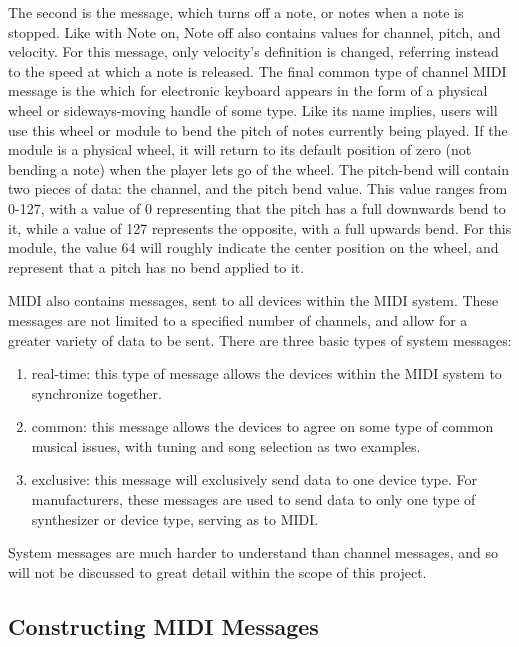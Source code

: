 The second is the  message, which turns off a note, or notes when a note is stopped. Like with Note on, Note off also contains values for channel, pitch, and velocity. For this message, only velocity's definition is changed, referring instead to the speed at which a note is released. The final common type of channel MIDI message is the  which for electronic keyboard appears in the form of a physical wheel or sideways-moving handle of some type. Like its name implies, users will use this wheel or module to bend the pitch of notes currently being played. If the module is a physical wheel, it will return to its default position of zero (not bending a note) when the player lets go of the wheel. The pitch-bend will contain two pieces of data: the channel, and the pitch bend value. This value ranges from 0-127, with a value of 0 representing that the pitch has a full downwards bend to it, while a value of 127 represents the opposite, with a full upwards bend\cite{Kirk_Hunt_2013}. For this module, the value 64 will roughly indicate the center position on the wheel, and represent that a pitch has no bend applied to it.

MIDI also contains  messages, sent to all devices within the MIDI system\cite{Romano_2003}. These messages are not limited to a specified number of channels, and allow for a greater variety of data to be sent. There are three basic types of system messages\cite{Kirk_Hunt_2013}:

\begin{enumerate}
	\item real-time: this type of message allows the devices within the MIDI system to synchronize together.
	\item common: this message allows the devices to agree on some type of common musical issues, with tuning and song selection as two examples.
	\item exclusive: this message will exclusively send data to one device type. For manufacturers, these messages are used to send data to only one type of synthesizer or device type, serving as  to MIDI.
\end{enumerate}\label{enu:midi-system-messages}

\noindent System messages are much harder to understand than channel messages, and so will not be discussed to great detail within the scope of this project.

\subsection[Constructing MIDI Messages]{Constructing MIDI Messages}\label{section:midi-messages}

